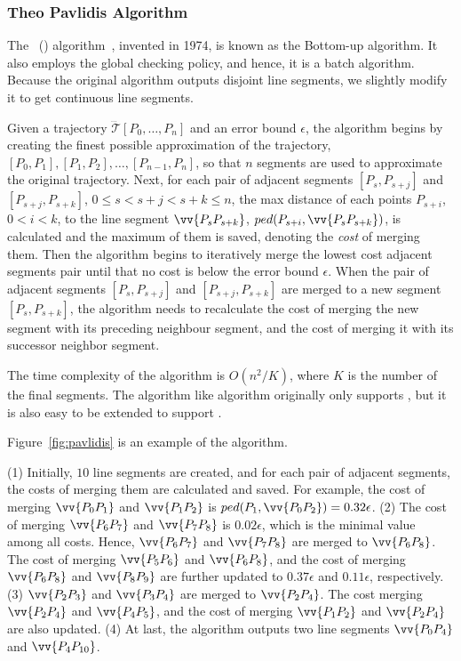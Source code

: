 \vspace{-1ex}
\subsubsection{Theo Pavlidis Algorithm}

The {\pavlidis~(\tpa) algorithm}~\cite{Pavlidis:Segment}, invented in 1974, is known as the Bottom-up algorithm. It also employs the global checking policy, and hence, it is a batch algorithm. Because the original \tpa algorithm outputs disjoint line segments, we slightly modify it to get continuous line segments.

Given a trajectory $\dddot{\mathcal{T}}[P_0, \ldots, P_n]$ and an error bound $\epsilon$,
the algorithm begins by creating the finest possible approximation of the trajectory, \ie $[P_0, P_1], [P_1, P_2], \ldots,[P_{n-1}, P_n]$, so that $n$ segments are used to approximate the original trajectory.
Next, for each pair of adjacent segments $[P_{s}, P_{s+j}]$ and $[P_{s+j}, P_{s+k}]$, $0\le s<s+j < s+k \le n$,
the max distance of each points $P_{s+i}$, $0<i<k$, to the line segment $\vv{P_sP_{s+k}}$, \ie $ped(P_{s+i}, \vv{P_sP_{s+k}})$, is calculated and the maximum of them is saved, denoting the \emph{cost} of merging them.
Then the algorithm begins to iteratively merge the lowest cost adjacent segments pair
until that no cost is below the error bound $\epsilon$.
When the pair of adjacent segments $[P_{s}, P_{s+j}]$ and $[P_{s+j}, P_{s+k}]$ are merged to a new segment $[P_{s}, P_{s+k}]$, the algorithm needs to recalculate the cost of merging the new segment with its preceding neighbour segment, and the cost of merging it with its successor neighbor segment.

The time complexity of the algorithm is $O(n^2/K)$, where $K$ is the number of the final segments.
The \tpa algorithm like \dpa algorithm originally only supports \ped, but it is also easy to be extended to support \sed.


\begin{example}
\label{exm-alg-pavlidis}
Figure~\ref{fig:pavlidis} is an example of the \tpa algorithm.

\ni (1) Initially, $10$ line segments are created, and for each pair of adjacent segments, the costs of merging them are calculated and saved. For example, the cost of merging $\vv{P_0P_1}$ and $\vv{P_1P_2}$ is $ped(P_{1}, \vv{P_0P_{2}}) = 0.32\epsilon$.
%
(2) The cost of merging $\vv{P_6P_7}$ and $\vv{P_7P_8}$ is $0.02\epsilon$, which is the minimal value among all costs. Hence, $\vv{P_6P_7}$ and $\vv{P_7P_8}$ are merged to $\vv{P_6P_8}$. The cost of merging $\vv{P_5P_6}$ and $\vv{P_6P_8}$, and the cost of merging $\vv{P_6P_8}$ and $\vv{P_8P_9}$ are further updated to $0.37\epsilon$ and $0.11\epsilon$, respectively.
%
(3) $\vv{P_2P_3}$ and $\vv{P_3P_4}$ are merged to $\vv{P_2P_4}$. The cost merging $\vv{P_2P_4}$ and $\vv{P_4P_5}$, and the cost of merging $\vv{P_1P_2}$ and $\vv{P_2P_4}$ are also updated.
%
(4) At last, the algorithm outputs two line segments $\vv{P_0P_4}$ and $\vv{P_4P_{10}}$.
\end{example}


